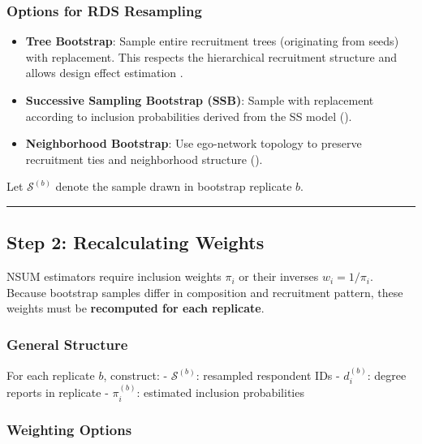 \documentclass[
  12pt,
  letterpaper,
  DIV=11,
  numbers=noendperiod]{scrartcl}
\providecommand{\tightlist}{%
  \setlength{\itemsep}{0pt}\setlength{\parskip}{0pt}}
\theoremstyle{plain}
\theoremstyle{definition}
\begin{document}
\subsubsection{Options for RDS
Resampling}\label{options-for-rds-resampling}

\begin{itemize}
\tightlist
\item
  \textbf{Tree Bootstrap}: Sample entire recruitment trees (originating
  from seeds) with replacement. This respects the hierarchical
  recruitment structure and allows design effect estimation
  \autocite{salg06-variance}.
\item
  \textbf{Successive Sampling Bootstrap (SSB)}: Sample with replacement
  according to inclusion probabilities derived from the SS model
  (\textcite{gile11-improv}).
\item
  \textbf{Neighborhood Bootstrap}: Use ego-network topology to preserve
  recruitment ties and neighborhood structure
  (\textcite{yauc22-neighboor}).
\end{itemize}

Let \(\mathcal{S}^{(b)}\) denote the sample drawn in bootstrap replicate
\(b\).

\begin{center}\rule{0.5\linewidth}{0.5pt}\end{center}

\subsection{Step 2: Recalculating
Weights}\label{step-2-recalculating-weights}

NSUM estimators require inclusion weights \(\pi_i\) or their inverses
\(w_i = 1 / \pi_i\). Because bootstrap samples differ in composition and
recruitment pattern, these weights must be \textbf{recomputed for each
replicate}.

\subsubsection{General Structure}\label{general-structure}

For each replicate \(b\), construct: - \(\mathcal{S}^{(b)}\): resampled
respondent IDs - \(d_i^{(b)}\): degree reports in replicate -
\(\pi_i^{(b)}\): estimated inclusion probabilities

\subsubsection{Weighting Options}\label{weighting-options}
\end{document}
